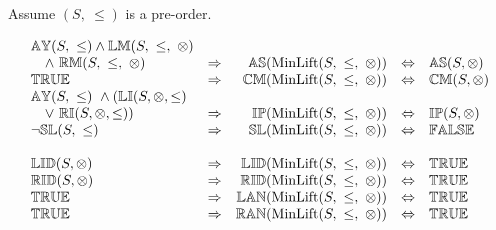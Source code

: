 Assume $(S,\ \leq)$ is a pre-order.

\[
\begin{array}{lcrcl} 
{\mathbb{AY}}(S,\ \leq) \wedge {\mathbb{LM}}(S,\ \leq,\ \otimes) \\
\ \ \ \wedge \ {\mathbb{RM}}(S,\ \leq,\ \otimes)
	& \Rightarrow
	& {\mathbb{AS}}(\mathrm{MinLift}(S,\ \leq,\ \otimes)) 
	& \Leftrightarrow 
	& {\mathbb{AS}}(S,\otimes)
	\\ 
{\mathbb{TRUE}}
	& \Rightarrow
	& {\mathbb{CM}}(\mathrm{MinLift}(S,\ \leq,\ \otimes)) 
	& \Leftrightarrow 
	& {\mathbb{CM}}(S,\otimes)
	\\ 
{\mathbb{AY}}(S,\ \leq) \ \wedge ({\mathbb{LI}}(S,\otimes,\leq) \\ 
\ \ \ \vee \ {\mathbb{RI}}(S,\otimes,\leq))
	& \Rightarrow
	& {\mathbb{IP}}(\mathrm{MinLift}(S,\ \leq,\ \otimes)) 
	& \Leftrightarrow
	& {\mathbb{IP}}(S,\otimes)
	\\ 
\neg {\mathbb{SL}}(S,\ \leq)
	& \Rightarrow
	& {\mathbb{SL}}(\mathrm{MinLift}(S,\ \leq,\ \otimes)) 
	& \Leftrightarrow 
	& {\mathbb{FALSE}}
	\\ \\
	
{\mathbb{LID}}(S, \otimes)
	& \Rightarrow
	& {\mathbb{LID}}(\mathrm{MinLift}(S,\ \leq,\ \otimes)) 
	& \Leftrightarrow 
	& {\mathbb{TRUE}}
	\\ 
{\mathbb{RID}}(S, \otimes)
	& \Rightarrow
	& {\mathbb{RID}}(\mathrm{MinLift}(S,\ \leq,\ \otimes)) 
	& \Leftrightarrow 
	& {\mathbb{TRUE}}
	\\ 
{\mathbb{TRUE}}
	& \Rightarrow
	& {\mathbb{LAN}}(\mathrm{MinLift}(S,\ \leq,\ \otimes)) 
	& \Leftrightarrow 
	& {\mathbb{TRUE}}
	\\
{\mathbb{TRUE}}
	& \Rightarrow
	& {\mathbb{RAN}}(\mathrm{MinLift}(S,\ \leq,\ \otimes)) 
	& \Leftrightarrow 
	& {\mathbb{TRUE}}
	\\\\
	

\end{array}\]
